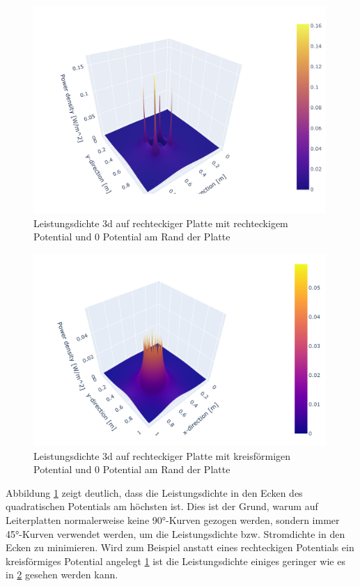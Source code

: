 \begin{figure}[h]
	\centering
	\includegraphics[width=0.99\textwidth]{papers/circuit/3d.png}
	\caption{Leistungsdichte 3d auf rechteckiger Platte mit rechteckigem Potential und 0 Potential am Rand der Platte \cite{github:AndreasFMueller}}
	\label{fig:power_3d_rectangle}
\end{figure}
\begin{figure}[h]
	\centering
	\includegraphics[width=0.99\textwidth]{papers/circuit/3d_circle.png}
	\caption{Leistungsdichte 3d auf rechteckiger Platte mit kreisförmigen Potential und 0 Potential am Rand der Platte \cite{github:AndreasFMueller}}
	\label{fig:power_3d_circle}
\end{figure}
Abbildung \ref{fig:power_3d_rectangle} zeigt deutlich, dass die Leistungsdichte in den Ecken des quadratischen Potentials am höchsten ist. Dies ist der Grund, warum auf Leiterplatten normalerweise keine 90°-Kurven gezogen werden, sondern immer 45°-Kurven verwendet werden, um die Leistungsdichte bzw. Stromdichte in den Ecken zu minimieren. Wird zum Beispiel anstatt eines rechteckigen Potentials ein kreisförmiges Potential angelegt \ref{fig:power_3d_rectangle} ist die Leistungsdichte einiges geringer wie es in \ref{fig:power_3d_circle} gesehen werden kann.

